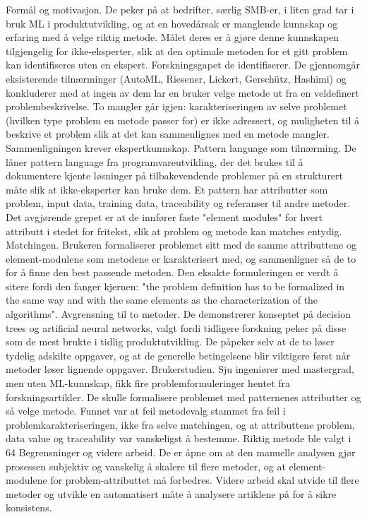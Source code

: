 Formål og motivasjon. De peker på at bedrifter, særlig SMB-er, i liten grad tar i bruk ML i produktutvikling, og at en hovedårsak er manglende kunnskap og erfaring med å velge riktig metode. Målet deres er å gjøre denne kunnskapen tilgjengelig for ikke-eksperter, slik at den optimale metoden for et gitt problem kan identifiseres uten en ekspert.
Forskningsgapet de identifiserer. De gjennomgår eksisterende tilnærminger (AutoML, Riesener, Lickert, Gerschütz, Hashimi) og konkluderer med at ingen av dem lar en bruker velge metode ut fra en veldefinert problembeskrivelse. To mangler går igjen: karakteriseringen av selve problemet (hvilken type problem en metode passer for) er ikke adressert, og muligheten til å beskrive et problem slik at det kan sammenlignes med en metode mangler. Sammenligningen krever ekspertkunnskap.
Pattern language som tilnærming. De låner pattern language fra programvareutvikling, der det brukes til å dokumentere kjente løsninger på tilbakevendende problemer på en strukturert måte slik at ikke-eksperter kan bruke dem. Et pattern har attributter som problem, input data, training data, traceability og referanser til andre metoder. Det avgjørende grepet er at de innfører faste "element modules" for hvert attributt i stedet for fritekst, slik at problem og metode kan matches entydig.
Matchingen. Brukeren formaliserer problemet sitt med de samme attributtene og element-modulene som metodene er karakterisert med, og sammenligner så de to for å finne den best passende metoden. Den eksakte formuleringen er verdt å sitere fordi den fanger kjernen: "the problem definition has to be formalized in the same way and with the same elements as the characterization of the algorithms".
Avgrensning til to metoder. De demonstrerer konseptet på decision trees og artificial neural networks, valgt fordi tidligere forskning peker på disse som de mest brukte i tidlig produktutvikling. De påpeker selv at de to løser tydelig adskilte oppgaver, og at de generelle betingelsene blir viktigere først når metoder løser lignende oppgaver.
Brukerstudien. Sju ingeniører med mastergrad, men uten ML-kunnskap, fikk fire problemformuleringer hentet fra forskningsartikler. De skulle formalisere problemet med patternenes attributter og så velge metode. Funnet var at feil metodevalg stammet fra feil i problemkarakteriseringen, ikke fra selve matchingen, og at attributtene problem, data value og traceability var vanskeligst å bestemme. Riktig metode ble valgt i 64 %
Begrensninger og videre arbeid. De er åpne om at den manuelle analysen gjør prosessen subjektiv og vanskelig å skalere til flere metoder, og at element-modulene for problem-attributtet må forbedres. Videre arbeid skal utvide til flere metoder og utvikle en automatisert måte å analysere artiklene på for å sikre konsistens.

